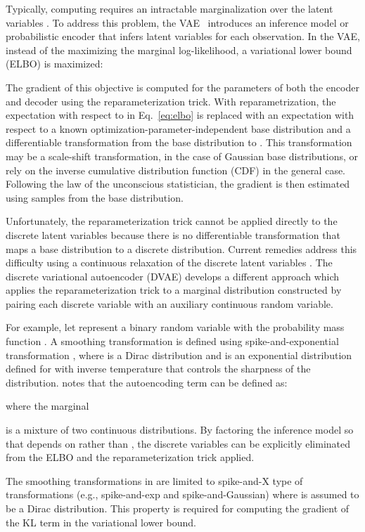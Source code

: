 \documentclass{article}
\begin{document}
Typically, computing  requires an intractable marginalization over the latent variables .
To address this problem, the VAE~\cite{kingma2014vae}
introduces an inference model or probabilistic encoder  that infers latent
variables for each observation. In the VAE, instead of the maximizing the marginal log-likelihood, a variational lower bound (ELBO) is maximized:

The gradient of this objective is computed for the parameters of both the encoder and decoder 
using the reparameterization trick. With reparametrization, the expectation with respect to  in Eq.~\eqref{eq:elbo}
is replaced with an expectation with respect to a known optimization-parameter-independent base distribution and a 
differentiable transformation from the base distribution to . This transformation may be a scale-shift transformation, in the case of Gaussian base distributions, or rely on the inverse cumulative distribution function (CDF) in the general case. Following the law of the unconscious statistician, 
the gradient is then estimated using samples from the base distribution.

Unfortunately, the reparameterization trick cannot be applied directly to the discrete latent variables 
because there is no differentiable transformation that maps a base distribution to a discrete distribution. 
Current remedies address this difficulty using a continuous relaxation of the discrete latent variables \cite{maddison2016concrete, jang2016categorical}. 
The discrete variational autoencoder (DVAE) \cite{rolfe2016discrete} develops a different approach 
which applies the reparameterization trick to a marginal distribution constructed by pairing each discrete variable with an auxiliary continuous random 
variable.

For example, let  represent a binary random variable with the probability mass function . 
A smoothing transformation is defined using spike-and-exponential transformation , 
where  is a Dirac  distribution and  
is an exponential distribution defined for 
with inverse temperature  that controls the sharpness of the distribution. 
\cite{rolfe2016discrete} notes that the autoencoding term can be defined as:

where the marginal 

is a mixture of two continuous distributions. By factoring the inference model so that  depends on  rather 
than , the discrete variables can be explicitly eliminated from the ELBO and the reparameterization trick applied.

The smoothing transformations in \cite{rolfe2016discrete} are limited to spike-and-X type of transformations (e.g., spike-and-exp and spike-and-Gaussian) where  is assumed to be a Dirac  distribution. This property is required for computing the gradient of the KL term in the 
variational lower bound.
\end{document}
